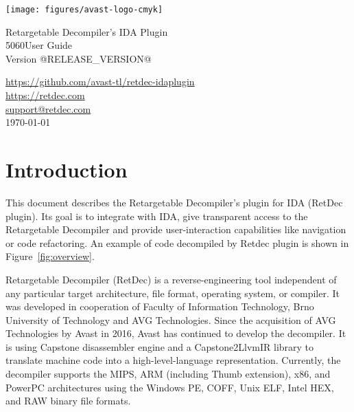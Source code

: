 \documentclass[pdftex, a4paper,12pt, oneside, svgnames]{article}
\makeatletter
\newcommand\HUGE{\@setfontsize\Huge{50}{60}}
\makeatother
\begin{document}

\begin{titlepage}
\begin{center}


\texttt{[image: figures/avast-logo-cmyk]}

\vfill

{\LARGE Retargetable Decompiler's IDA Plugin}
\\[5 mm]
{\HUGE User Guide}
\\[3 mm]
{\large Version @RELEASE_VERSION@}

\vfill

{\LARGE
\href{https://github.com/avast-tl/retdec-idaplugin}{https://github.com/avast-tl/retdec-idaplugin} \\[2 mm]
\href{https://retdec.com}{https://retdec.com} \\[2 mm]
\href{mailto:support@retdec.com}{support@retdec.com} \\[4 mm]
\today}

\end{center}
\end{titlepage}


\tableofcontents

\newpage
\section{Introduction}
\label{sec:introduction}
This document describes the Retargetable Decompiler's plugin for IDA (RetDec plugin). Its goal is to integrate with IDA, give transparent access to the Retargetable Decompiler and provide user-interaction capabilities like navigation or code refactoring. An example of code decompiled by Retdec plugin is shown in Figure~\ref{fig:overview}.

Retargetable Decompiler (RetDec) is a reverse-engineering tool independent of any particular target architecture, file format, operating system, or compiler. It was developed in cooperation of Faculty of Information Technology, Brno University of Technology and AVG Technologies. Since the acquisition of AVG Technologies by Avast in 2016, Avast has continued to develop the decompiler. It is using Capstone disassembler engine and a Capstone2LlvmIR library to translate machine code into a high-level-language representation. Currently, the decompiler supports the MIPS, ARM (including Thumb extension), x86, and PowerPC architectures using the Windows PE, COFF, Unix ELF, Intel HEX, and RAW binary file formats.
\end{document}
